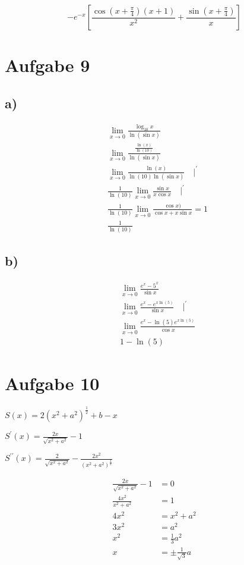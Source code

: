 \documentclass[a4paper, ngerman]{scrartcl}
\begin{document}
		$$-e^{-x}\left[\frac{\cos(x+\frac{\pi}{4})(x+1)}{x^2}+\frac{\sin(x+\frac{\pi}{4})}{x}\right]$$
		
	\section*{Aufgabe 9}
	\subsection*{a)}
	\begin{align*}
		&\lim_{x\rightarrow0}\frac{\log_{10}x}{\ln(\sin x)}\\
		&\lim_{x\rightarrow0}\frac{\frac{\ln(x)}{\ln(10)}}{\ln(\sin x)}\\
		&\lim_{x\rightarrow0}\frac{\ln(x)}{\ln(10)\ln(\sin x)} \quad \vert ^\prime\\
		&\frac{1}{\ln(10)}\lim_{x\rightarrow0}\frac{\sin x}{x\cos x} \quad \vert ^\prime\\
		&\frac{1}{\ln(10)}\lim_{x\rightarrow0}\frac{\cos x)}{\cos x + x\sin x} = 1\\
		&\frac{1}{\ln(10)}
	\end{align*}	
	\subsection*{b)}
	\begin{align*}
		&\lim_{x\rightarrow0}\frac{e^x-5^x}{\sin x}\\
		&\lim_{x\rightarrow0}\frac{e^x-e^{x\ln(5)}}{\sin x} \quad \vert ^\prime\\
		&\lim_{x\rightarrow0}\frac{e^x-\ln(5)e^{x\ln(5)}}{\cos x}\\
		&1-\ln(5)
	\end{align*}

	\section*{Aufgabe 10}
	\quad $S(x) = 2(x^2+a^2)^\frac{1}{2}+b-x$
	
	$S^\prime(x) = \frac{2x}{\sqrt{x^{2} + a^{2}}} - 1$
	
	$S^{\prime\prime}(x) = \frac{2}{\sqrt{x^{2} + a^{2}}} - \frac{2x^{2}}{\left(x^{2} + a^{2}\right)^{\frac{3}{2}}}$
	
	\begin{align*}
		\frac{2x}{\sqrt{x^{2} + a^{2}}} - 1 &= 0\\
		\frac{4x^2}{x^{2} + a^{2}}  &= 1\\
		4x^2  &= x^{2} + a^{2}\\
		3x^2  &= a^{2}\\
		x^2  &= \frac{1}{3}a^{2}\\
		x  &= \pm\frac{1}{\sqrt{3}}a\\
	\end{align*}
\end{document}
